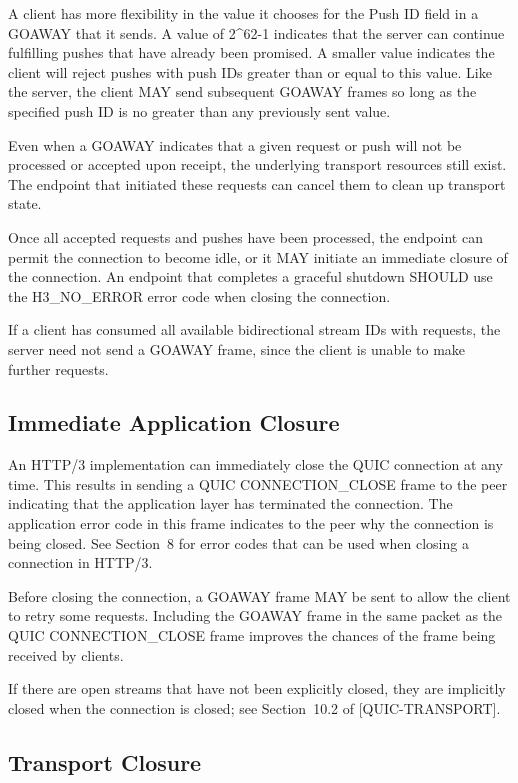 \documentclass{article}
\begin{document}
\begin{itemize}
A client has more flexibility in the value it chooses for the Push ID field in a GOAWAY that it sends.  A value of 2\textasciicircum{}62-1 indicates that the server can continue fulfilling pushes that have already been promised.  A smaller value indicates the client will reject pushes with push IDs greater than or equal to this value.  Like the server, the client MAY send subsequent GOAWAY frames so long as the specified push ID is no greater than any previously sent value.

Even when a GOAWAY indicates that a given request or push will not be processed or accepted upon receipt, the underlying transport resources still exist.  The endpoint that initiated these requests can cancel them to clean up transport state.

Once all accepted requests and pushes have been processed, the endpoint can permit the connection to become idle, or it MAY initiate an immediate closure of the connection.  An endpoint that completes a graceful shutdown SHOULD use the H3\_NO\_ERROR error code when closing the connection.

If a client has consumed all available bidirectional stream IDs with requests, the server need not send a GOAWAY frame, since the client is unable to make further requests.

\end{itemize}
\subsection{Immediate Application Closure}

An HTTP/3 implementation can immediately close the QUIC connection at any time.  This results in sending a QUIC CONNECTION\_CLOSE frame to the peer indicating that the application layer has terminated the connection.  The application error code in this frame indicates to the peer why the connection is being closed.  See Section~8 for error codes that can be used when closing a connection in HTTP/3.

Before closing the connection, a GOAWAY frame MAY be sent to allow the client to retry some requests.  Including the GOAWAY frame in the same packet as the QUIC CONNECTION\_CLOSE frame improves the chances of the frame being received by clients.

If there are open streams that have not been explicitly closed, they are implicitly closed when the connection is closed; see Section~10.2 of [QUIC-TRANSPORT].

\subsection{Transport Closure}
\end{document}
